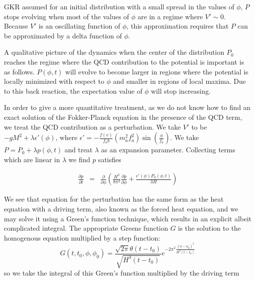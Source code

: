 \documentclass[12pt,aps,prd,showpacs,notitlepage,nofootinbib]{revtex4-1}
\newcommand{\beq}{\begin{equation}}
\newcommand{\bea}{\begin{eqnarray}}
\newcommand{\eeq}{\end{equation}}
\newcommand{\eea}{\end{eqnarray}}
\begin{document}
 
   GKR assumed for an initial distribution with a small spread in the values of $\phi$, $P$ stops evolving when most of the values of $\phi$ are in a regime where $V'\sim 0$.  Because $V'$ is an oscillating function of $\phi$, this approximation requires that $P$   can be approximated by a delta function of $\phi$.   
   
  A qualitative picture of the dynamics when the center of the distribution $P_0$ reaches the regime where the QCD contribution to the potential   is important is as follows.  $P(\phi,t)$ will evolve to become larger in regions where the potential is locally minimized with respect to $\phi$ and smaller in regions  of local maxima.  Due to this back reaction,  the expectation value of $\phi$ will stop increasing. 

In order to give a more quantitative treatment, as we do not know how to find an exact solution of the Fokker-Planck equation in the presence of the QCD term,  we treat  the QCD contribution as a perturbation.  
We take  $V'$  to be  $-g M^2 + \lambda \epsilon'(\phi)$, where $\epsilon'=- \frac{f(v)}{ f_a b}(m_a^2 f_a^2)\sin(\frac{\phi}{f_a})$. We take   $P=P_0+\lambda p(\phi,t)$ and treat $\lambda$ as an expansion parameter. Collecting terms which are linear in $\lambda$ we find $p$ satisfies

\bea
\frac{\partial p}{\partial t}&=&\frac{\partial}{\partial \phi} \left( \frac{H^3}{8 \pi^2} \frac{\partial p}{\partial \phi} + 
\frac{\epsilon'(\phi) P_0(\phi,t)}{3 H} \right) \eea
 
 
We see that equation for the perturbation has the same form as the heat equation with a driving term, also known as the forced heat equation, and we may solve it using a Green's function technique, which results in an explicit albeit complicated integral.   
 The appropriate Greens function $G$ is the solution to the homogenous equation multiplied by a step function:
\beq 
G(t,t_0,\phi,\phi_0)= \frac{ \sqrt{2\pi } \theta(t-t_0)}{\sqrt{H^3(t-t_0)} }e^{ -2\pi^2 \frac{ (\phi-\phi_0  )^2}{H^3 (t-t_0)} }
\eeq 
so we take the integral of this Green's function multiplied by the driving term
\end{document}
